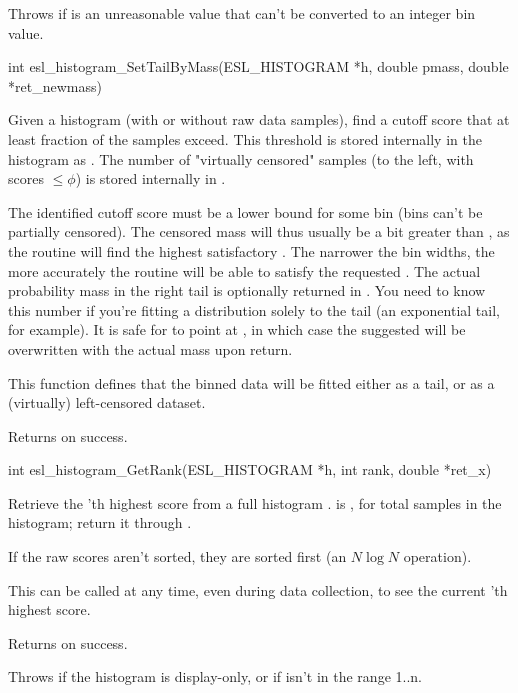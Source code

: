 \begin{sreapi}
Throws  if  is an unreasonable value that
can't be converted to an integer bin value.


\hypertarget{func:esl_histogram_SetTailByMass()}
{\item[int esl\_histogram\_SetTailByMass(ESL\_HISTOGRAM *h, double pmass, double *ret\_newmass)]}

Given a histogram  (with or without raw data samples),
find a cutoff score that at least fraction  of the samples
exceed. This threshold is stored internally in the histogram
as . The number of "virtually censored" samples (to the 
left, with scores $\leq \phi$) is stored internally in .

The identified cutoff score must be a lower bound for some bin
(bins can't be partially censored). The censored mass
will thus usually be a bit greater than , as the
routine will find the highest satisfactory . The
narrower the bin widths, the more accurately the routine
will be able to satisfy the requested . The actual
probability mass in the right tail is optionally returned
in . You need to know this number if you're 
fitting a distribution solely to the tail (an exponential tail,
for example). It is safe for  to point at 
, in which case the suggested  will be overwritten
with the actual mass upon return.

This function defines that the binned data will be
fitted either as a tail, or as a (virtually) left-censored dataset.

Returns  on success.


\hypertarget{func:esl_histogram_GetRank()}
{\item[int esl\_histogram\_GetRank(ESL\_HISTOGRAM *h, int rank, double *ret\_x)]}

Retrieve the 'th highest score from a 
full histogram .  is , for
 total samples in the histogram; return it through
.

If the raw scores aren't sorted, they are sorted
first (an $N \log N$ operation).

This can be called at any time, even during data
collection, to see the current 'th highest score.

Returns  on success.

Throws  if the histogram is display-only,
or if  isn't in the range 1..n.



\end{sreapi}
